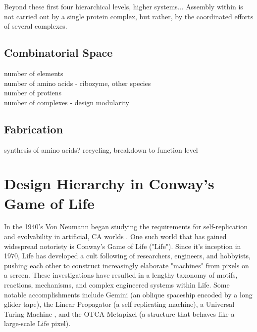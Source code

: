 {Beyond these first four hierarchical levels, higher systems...
Assembly within is not carried out by a single protein complex, but rather, by the coordinated efforts of several complexes.

\subsection{Combinatorial Space}

number of elements\\
number of amino acids - ribozyme, other species\\
number of protiens\\
number of complexes - design modularity\\

\subsection{Fabrication}

synthesis of amino acids? recycling, breakdown to function level

\section{Design Hierarchy in Conway's Game of Life}

In the 1940's Von Neumann began studying the requirements for self-replication and evolvability in artificial, CA worlds \cite{Neumann1966}.  One such world that has gained widespread notoriety is Conway's Game of Life ("Life").  Since it's inception in 1970, Life has developed a cult following of researchers, engineers, and hobbyists, pushing each other to construct increasingly elaborate "machines" from pixels on a screen.  These investigations have resulted in a lengthy taxonomy of motifs, reactions, mechanisms, and complex engineered systems within Life.  Some notable accomplishments include Gemini (an oblique spaceship encoded by a long glider tape)\cite{Wade2010}, the Linear Propagator (a self replicating machine)\cite{Greene2013}, a Universal Turing Machine \cite{Rendell2000}, and the OTCA Metapixel (a structure that behaves like a large-scale Life pixel)\cite{Due2006}.\\

}
